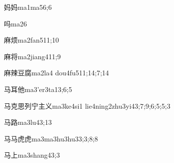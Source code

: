 
\begin{verbete}{妈妈}{ma1ma5}{6;6}
\end{verbete}

\begin{verbete}{吗}{ma2}{6}
\end{verbete}

\begin{verbete}{麻烦}{ma2fan5}{11;10}
\end{verbete}

\begin{verbete}{麻将}{ma2jiang4}{11;9}
\end{verbete}

\begin{verbete}{麻辣豆腐}{ma2la4 dou4fu5}{11;14;7;14}
\end{verbete}

\begin{verbete}{马耳他}{ma3'er3ta1}{3;6;5}
\end{verbete}

\begin{verbete}{马克思列宁主义}{ma3ke4si1 lie4ning2zhu3yi4}{3;7;9;6;5;5;3}
\end{verbete}

\begin{verbete}{马路}{ma3lu4}{3;13}
\end{verbete}

\begin{verbete}{马马虎虎}{ma3ma3hu3hu3}{3;3;8;8}
\end{verbete}

\begin{verbete}{马上}{ma3shang4}{3;3}
\end{verbete}

